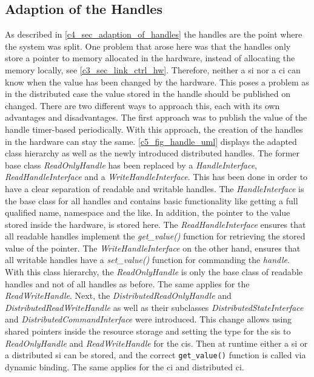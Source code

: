 \subsection{Adaption of the Handles}
As described in \autoref{c4_sec_adaption_of_handles} the \glspl{handle} are the point where the system was split. One problem that arose here was that the \glspl{handle} only store a pointer to memory allocated in the hardware, instead of allocating the memory locally, see \autoref{c3_sec_link_ctrl_hw}. Therefore, neither a \gls{si} nor a \gls{ci} can know when the value has been changed by the hardware. This poses a problem as in the distributed case the value stored in the \gls{handle} should be published on changed. There are two different ways to approach this, each with its own advantages and disadvantages. The first approach was to publish the value of the \gls{handle} timer-based periodically. With this approach, the creation of the \glspl{handle} in the hardware can stay the same. \autoref{c5_fig_handle_uml} displays the adapted class hierarchy as well as the newly introduced distributed \glspl{handle}. The former base class \textit{ReadOnlyHandle} has been replaced by a \textit{HandleInterface}, \textit{ReadHandleInterface} and a \textit{WriteHandleInterface}. This has been done in order to have a clear separation of readable and writable \glspl{handle}. The \textit{HandleInterface} is the base class for all \glspl{handle} and contains basic functionality like getting a full qualified name, namespace and the like. In addition, the pointer to the value stored inside the hardware, is stored here. The \textit{ReadHandleInterface} ensures that all readable \glspl{handle} implement the \textit{get\_value()} function for retrieving the stored value of the pointer. The \textit{WriteHandleInterface} on the other hand, ensures that all writable \glspl{handle} have a \textit{set\_value()} function for commanding the \textit{handle}. \newline
With this class hierarchy, the \textit{ReadOnlyHandle} is only the base class of readable \glspl{handle} and not of all \glspl{handle} as before. The same applies for the \textit{ReadWriteHandle}. Next, the \textit{DistributedReadOnlyHandle} and \textit{DistributedReadWriteHandle} as well as their subclasses \textit{DistributedStateInterface} and \textit{DistributedCommandInterface} were introduced. This change allows using shared pointers inside the resource storage and setting the type for the \glspl{si} to \textit{ReadOnlyHandle} and \textit{ReadWriteHandle} for the \glspl{ci}. Then at runtime either a \gls{si} or a distributed \gls{si} can be stored, and the correct \lstset{language=C++,basicstyle=\small\ttfamily}\lstinline{get_value()} function is called via dynamic binding. The same applies for the \gls{ci} and distributed \gls{ci}. \newline
